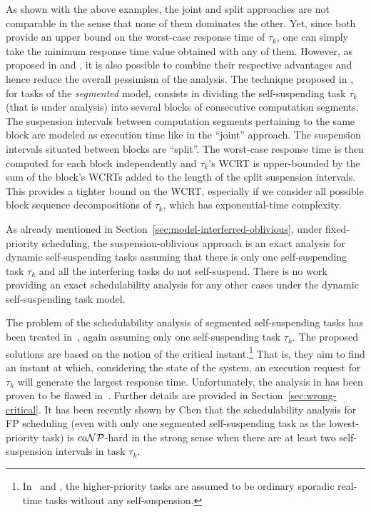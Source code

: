 As shown with the above examples, the joint and split approaches are not comparable in the sense that none 
of them dominates the other. Yet, since both provide an upper bound on the worst-case response time of $\tau_k$, one can 
simply take the minimum response time value obtained with any of them. However, as proposed in \cite[Chapter 5.4]{bletsas:thesis} and \cite{Huang:multiseg}, 
it is also possible to combine their respective advantages and hence reduce the overall pessimism of the analysis. 
The technique proposed in \cite{bletsas:thesis}, for tasks of the \emph{segmented} model,
consists in dividing the self-suspending task $\tau_k$ (that is under analysis) into several blocks of consecutive 
computation segments. The suspension intervals between computation segments pertaining to the same block are modeled as execution time 
like in the ``joint'' approach. The suspension intervals situated between blocks are ``split''. The worst-case response time is then computed for each 
block independently and $\tau_k$'s WCRT is upper-bounded by the sum of the block's WCRTs added to the length of the split suspension 
intervals. This provides a tighter bound on the WCRT, especially if we consider all possible block sequence decompositions of $\tau_k$, which has exponential-time complexity. 

\label{sec:existing-exact-special}

As already mentioned in Section~\ref{sec:model-interferred-oblivious}, under fixed-priority scheduling, the suspension-oblivious approach is an exact analysis for dynamic 
self-suspending tasks assuming that there is only one self-suspending task $\tau_k$ and all the interfering tasks do not self-suspend. 
There is no work providing an exact schedulability analysis for any other cases under the dynamic self-suspending task model.

The problem of the schedulability analysis of segmented self-suspending tasks has been treated in~\cite{LR:rtas10,ecrts15nelissen}, 
again assuming only one self-suspending task $\tau_k$. The proposed solutions are based on the notion of the critical instant.\footnote{\label{footnote-critical-instant}In~\cite[Secs. IV-V]{ecrts15nelissen} and
    \cite[Sec. III]{LR:rtas10}, the higher-priority tasks are assumed
    to be ordinary sporadic real-time tasks without any
    self-suspension.}
That is, they aim to find an instant at which, considering the state of the system, an execution request for $\tau_k$ will 
generate the largest response time. Unfortunately, the analysis in \cite{LR:rtas10} has been proven to be flawed in~\cite{ecrts15nelissen}. 
Further details are provided in Section~\ref{sec:wrong-critical}. It has been recently shown by Chen \cite{RTSS2016-suspension}
that the schedulability analysis for FP scheduling (even with only one segmented self-suspending
task as the lowest-priority task) is $co{\cal NP}$-hard in the strong
sense when there are at least two self-suspension intervals in task $\tau_k$.





